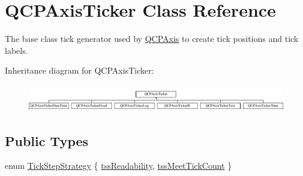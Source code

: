 \hypertarget{class_q_c_p_axis_ticker}{}\section{Q\+C\+P\+Axis\+Ticker Class Reference}
\label{class_q_c_p_axis_ticker}


The base class tick generator used by \hyperlink{class_q_c_p_axis}{Q\+C\+P\+Axis} to create tick positions and tick labels.  


Inheritance diagram for Q\+C\+P\+Axis\+Ticker\+:\begin{figure}[H]
\begin{center}
\leavevmode
\includegraphics[height=1.181435cm]{class_q_c_p_axis_ticker}
\end{center}
\end{figure}
\subsection*{Public Types}
\begin{DoxyCompactItemize}
\item 
enum \hyperlink{class_q_c_p_axis_ticker_ab6d2f9d9477821623ac9bc4b21ddf49a}{Tick\+Step\+Strategy} \{ \hyperlink{class_q_c_p_axis_ticker_ab6d2f9d9477821623ac9bc4b21ddf49aa9002aa2fd5633ab5556c71a26fed63a8}{tss\+Readability}, 
\hyperlink{class_q_c_p_axis_ticker_ab6d2f9d9477821623ac9bc4b21ddf49aa770312b6b9b0c64a37ceeba96e0cd7f2}{tss\+Meet\+Tick\+Count}
 \}
\end{DoxyCompactItemize}
